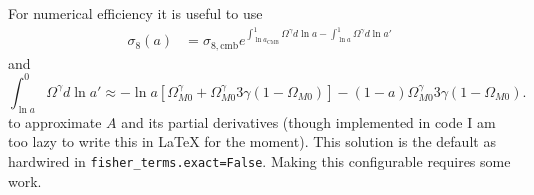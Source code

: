 \documentclass{article}
\begin{document}
For numerical efficiency it is useful to use
\begin{align}
\sigma_8(a) & =\sigma_{8,\text{cmb}}  
 e^{\int^1_{\ln{a_\text{CMB}}} \Omega^\gamma d\ln{a} - \int_{\ln{a}}^1 \Omega^\gamma d\ln{a'} } 
\end{align}
and
\begin{equation}
\int_{\ln{a}}^0 \Omega^\gamma d\ln{a'} \approx -\ln{a} \left[\Omega_{M0}^\gamma + \Omega_{M0}^\gamma 3\gamma(1-\Omega_{M0} )\right] 
- (1-a) \Omega_{M0}^\gamma 3\gamma (1-\Omega_{M0}).
\end{equation}
to approximate $A$ and its partial derivatives (though implemented in code I am too lazy to write this in LaTeX for the moment).  This solution is the default as hardwired in {\tt fisher\_terms.exact=False}.  Making this configurable requires some work.
\end{document}

